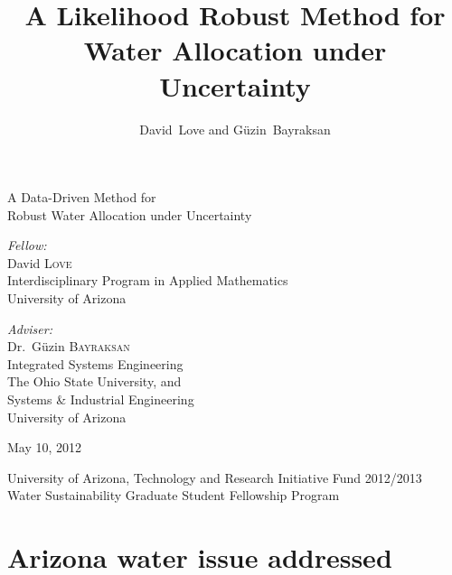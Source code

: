 \documentclass[12pt]{amsart}
\author{David~Love and G\"{u}zin~Bayraksan}
\title{A Likelihood Robust Method for Water Allocation under Uncertainty}
\date{}
\begin{document}
\begin{titlepage}
\begin{center}

\vspace*{4cm}

{ \huge A Data-Driven Method for\medskip\\ Robust Water Allocation under Uncertainty}\\%

\vspace{3cm}

\begin{minipage}{0.45\textwidth}
\begin{flushleft} \large
\emph{Fellow:}\\
 David \textsc{Love}\\
 Interdisciplinary Program in Applied Mathematics\\
 University of Arizona
\end{flushleft}
\end{minipage}
\begin{minipage}{0.45\textwidth}
\begin{flushright} \large
\emph{Adviser:} \\
 Dr.~G\"{u}zin \textsc{Bayraksan}\\
 Integrated Systems Engineering\\
 The Ohio State University, and\\
 Systems \& Industrial Engineering\\
 University of Arizona
\end{flushright}
\end{minipage}

\vspace{2cm}

{\large May 10, 2012}

\vspace{2cm}

{\large University of Arizona, Technology and Research Initiative Fund 2012/2013\\Water Sustainability Graduate Student Fellowship Program}

\end{center}
\end{titlepage}

\section{Arizona water issue addressed}
\end{document}
